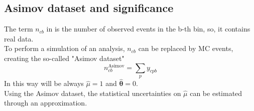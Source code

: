 \subsection{Asimov dataset and significance} The term $n_{cb}$ in  is the number of observed events in the b-th bin, so, it contains real data.\\
To perform a simulation of an analysis, $n_{cb}$ can be replaced by MC events, creating the so-called "Asimov dataset" \cite{Cowan2011AsymptoticPhysics}
\begin{equation}
    n_{cb}^{\text{Asimov}}=\sum_p y_{cpb}
\end{equation}
In this way will be always $\hat{\mu}=1$ and $\bm{\hat{\theta}}=0$.\\
Using the Asimov dataset, the statistical uncertainties on $\hat{\mu}$ can be estimated through an approximation.
\newpage

